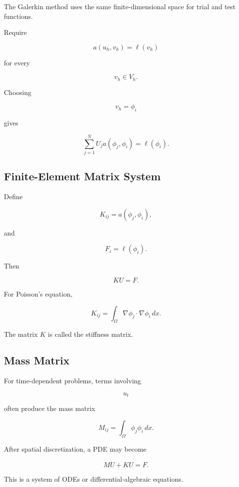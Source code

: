 The Galerkin method uses the same finite-dimensional space for trial and
test functions.

Require

\[
\boxed{
a(u_h,v_h)
=
\ell(v_h)
}
\]

for every

\[
v_h\in V_h.
\]

Choosing

\[
v_h=\phi_i
\]

gives

\[
\boxed{
\sum_{j=1}^{N}
U_j
a(\phi_j,\phi_i)
=
\ell(\phi_i).
}
\]

\subsection{Finite-Element Matrix System}
\label{subsec:finite-element-matrix}

Define

\[
\boxed{
K_{ij}
=
a(\phi_j,\phi_i),
}
\]

and

\[
\boxed{
F_i
=
\ell(\phi_i).
}
\]

Then

\[
\boxed{
KU=F.
}
\]

For Poisson's equation,

\[
\boxed{
K_{ij}
=
\int_\Omega
\nabla\phi_j
\cdot
\nabla\phi_i
\,dx.
}
\]

The matrix \(K\) is called the stiffness matrix.

\subsection{Mass Matrix}
\label{subsec:finite-element-mass-matrix}

For time-dependent problems, terms involving

\[
u_t
\]

often produce the mass matrix

\[
\boxed{
M_{ij}
=
\int_\Omega
\phi_j\phi_i
\,dx.
}
\]

After spatial discretization, a PDE may become

\[
\boxed{
M\dot{U}
+
KU
=
F.
}
\]

This is a system of ODEs or differential-algebraic equations.


